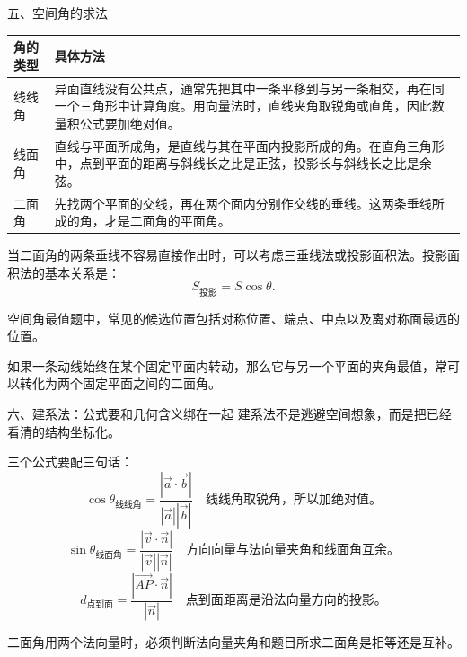 \documentclass[11pt,a4paper]{ctexart}
\begin{document}
\begin{teachbox}{五、空间角的求法}
\renewcommand{\arraystretch}{1.35}
\begin{tabularx}{\textwidth}{p{2.8cm}X}
\toprule
角的类型 & 具体方法 \\
\midrule
线线角 & 异面直线没有公共点，通常先把其中一条平移到与另一条相交，再在同一个三角形中计算角度。用向量法时，直线夹角取锐角或直角，因此数量积公式要加绝对值。\\ \hline
线面角 & 直线与平面所成角，是直线与其在平面内投影所成的角。在直角三角形中，点到平面的距离与斜线长之比是正弦，投影长与斜线长之比是余弦。\\ \hline
二面角 & 先找两个平面的交线，再在两个面内分别作交线的垂线。这两条垂线所成的角，才是二面角的平面角。\\
\bottomrule
\end{tabularx}

当二面角的两条垂线不容易直接作出时，可以考虑三垂线法或投影面积法。投影面积法的基本关系是：
\[
  S_{\text{投影}}=S\cos\theta.
\]

空间角最值题中，常见的候选位置包括对称位置、端点、中点以及离对称面最远的位置。

如果一条动线始终在某个固定平面内转动，那么它与另一个平面的夹角最值，常可以转化为两个固定平面之间的二面角。
\end{teachbox}

\begin{teachbox}{六、建系法：公式要和几何含义绑在一起}
建系法不是逃避空间想象，而是把已经看清的结构坐标化。

三个公式要配三句话：
\[
  \cos\theta_{\text{线线角}}
  =
  \frac{|\vec a\cdot\vec b|}{|\vec a||\vec b|}
  \quad
  \text{线线角取锐角，所以加绝对值。}
\]
\[
  \sin\theta_{\text{线面角}}
  =
  \frac{|\vec v\cdot\vec n|}{|\vec v||\vec n|}
  \quad
  \text{方向向量与法向量夹角和线面角互余。}
\]
\[
  d_{\text{点到面}}
  =
  \frac{|\overrightarrow{AP}\cdot\vec n|}{|\vec n|}
  \quad
  \text{点到面距离是沿法向量方向的投影。}
\]

二面角用两个法向量时，必须判断法向量夹角和题目所求二面角是相等还是互补。
\end{teachbox}
\end{document}
